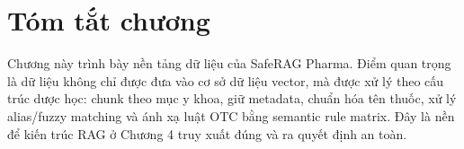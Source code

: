 \section{Tóm tắt chương}

Chương này trình bày nền tảng dữ liệu của SafeRAG Pharma. Điểm quan trọng là dữ liệu không chỉ được đưa vào cơ sở dữ liệu vector, mà được xử lý theo cấu trúc dược học: chunk theo mục y khoa, giữ metadata, chuẩn hóa tên thuốc, xử lý alias/fuzzy matching và ánh xạ luật OTC bằng semantic rule matrix. Đây là nền để kiến trúc RAG ở Chương 4 truy xuất đúng và ra quyết định an toàn.
